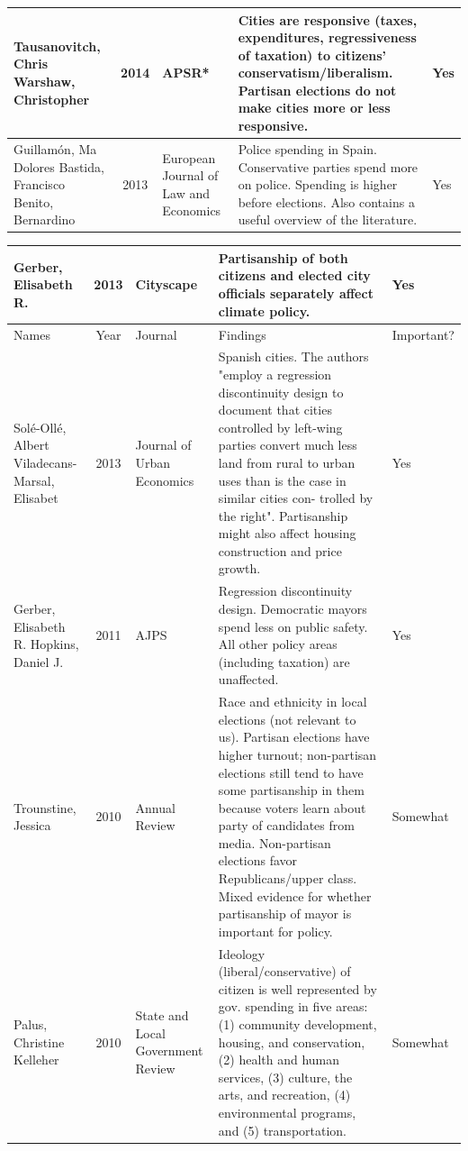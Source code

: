 \documentclass[11pt]{article}
\begin{document}
\begin{landscape}
\begin{table}[htbp]
\begin{tabular}{|p{2cm}|c|p{3cm}|p{12cm}|l|}
		Tausanovitch, Chris
		Warshaw, Christopher & 2014 & APSR* & Cities are responsive (taxes, expenditures, regressiveness of taxation) to citizens' conservatism/liberalism. Partisan elections do not make cities more or less responsive. & Yes \\ \hline
		Guillamón, Ma Dolores
		Bastida, Francisco
		Benito, Bernardino & 2013 & European Journal of Law and Economics & Police spending in Spain. Conservative parties spend more on police. Spending is higher before elections. Also contains a useful overview of the literature. & Yes \\ \hline
	\end{tabular}
	\label{}
\end{table}
\end{landscape}

\begin{landscape}
	\begin{table}[htbp]
		\begin{tabular}{|p{2cm}|c|p{3cm}|p{12cm}|l|}
			\hline
			Gerber, Elisabeth R. & 2013 & Cityscape & Partisanship of both citizens and elected city officials separately affect climate policy. & Yes \\ \hline
			Names & Year & Journal & Findings & Important? \\ \hline
			Solé-Ollé, Albert
			Viladecans-Marsal, Elisabet & 2013 & Journal of Urban Economics & Spanish cities. The authors "employ a regression discontinuity design to document that cities controlled by left-wing parties convert much less land from rural to urban uses than is the case in similar cities con- trolled by the right". Partisanship might also affect housing construction and price growth. & Yes \\ \hline
			Gerber, Elisabeth R.
			Hopkins, Daniel J. & 2011 & AJPS & Regression discontinuity design. Democratic mayors spend less on public safety. All other policy areas (including taxation) are unaffected. & Yes \\ \hline
			Trounstine, Jessica & 2010 & Annual Review & Race and ethnicity in local elections (not relevant to us). Partisan elections have higher turnout; non-partisan elections still tend to have some partisanship in them because voters learn about party of candidates from media. Non-partisan elections favor Republicans/upper class. Mixed evidence for whether partisanship of mayor is important for policy. & Somewhat \\ \hline
			Palus, Christine Kelleher & 2010 & State and Local Government Review & Ideology (liberal/conservative) of citizen is well represented by gov. spending in five areas: (1) community development, housing, and conservation, (2) health and human services, (3) culture, the arts, and recreation, (4) environmental programs, and (5) transportation. & Somewhat \\ \hline

\end{tabular}
\end{table}
\end{landscape}
\end{document}
